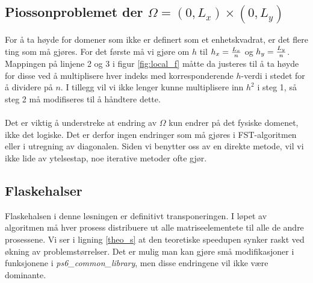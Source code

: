 \documentclass{article}
\begin{document}
\subsection{Piossonproblemet der $\Omega = (0, L_x) \times (0, L_y)$}
For å ta høyde for domener som ikke er definert som et enhetskvadrat, er det flere ting som må gjøres. For det første må vi gjøre om $h$ til $h_x = {L_x \over n}$ og $h_y = {L_y \over n}$. Mappingen på linjene 2 og 3 i figur \ref{fig:local_f} måtte da justeres til å ta høyde for disse ved å multiplisere hver indeks med korresponderende $h$-verdi i stedet for å dividere på $n$. I tillegg vil vi ikke lenger kunne multiplisere inn $h^2$ i steg 1, så steg 2 må modifiseres til å håndtere dette.\\
\\
Det er viktig å understreke at endring av $\Omega$ kun endrer på det fysiske domenet, ikke det logiske. Det er derfor ingen endringer som må gjøres i FST-algoritmen eller i utregning av diagonalen. Siden vi benytter oss av en direkte metode, vil vi ikke lide av ytelsestap, noe iterative metoder ofte gjør.

\subsection{Flaskehalser}
Flaskehalsen i denne løsningen er definitivt transponeringen. I løpet av algoritmen må hver prosess distribuere ut alle matriseelementete til alle de andre prosessene. Vi ser i ligning \ref{theo_s} at den teoretiske speedupen synker raskt ved økning av problemstørrelser. Det er mulig man kan gjøre små modifikasjoner i funksjonene i \emph{ps6\_common\_library}, men disse endringene vil ikke være dominante.


\end{document}

